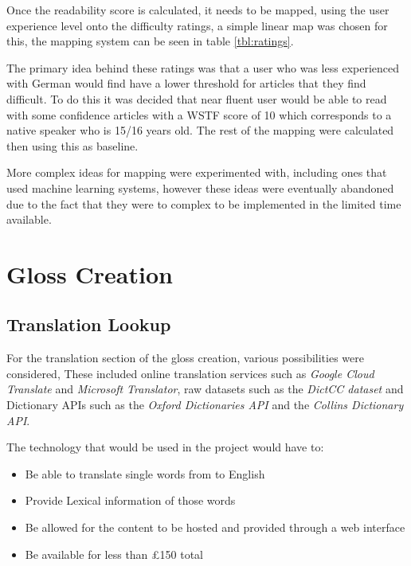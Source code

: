 Once the readability score is calculated, it needs to be mapped, using the user experience level onto the difficulty ratings, a simple linear map was chosen for this, the mapping system can be seen in table \ref{tbl:ratings}.



The primary idea behind these ratings was that a user who was less experienced with German would find have a lower threshold for articles that they find difficult. To do this it was decided that near fluent user would be able to read with some confidence articles with a WSTF score of 10 which corresponds to a native speaker who is 15/16 years old. The rest of the mapping were calculated then using this as baseline. 

More complex ideas for mapping were experimented with, including ones that used machine learning systems, however these ideas were eventually abandoned due to the fact that they were to complex to be implemented in the limited time available. 


\section{Gloss Creation}



\subsection{Translation Lookup}

For the translation section of the gloss creation, various possibilities were considered, These included online translation services such as \textit{Google Cloud Translate} and \textit{Microsoft Translator}, raw datasets such as the \textit{DictCC dataset} and Dictionary APIs such as the \textit{Oxford Dictionaries API} and the \textit{Collins Dictionary API}. 

The technology that would be used in the project would have to:
\begin{itemize}
\item Be able to translate single words from to English
\item Provide Lexical information of those words
\item Be allowed for the content to be hosted and provided through a web interface
\item Be available for less than \pounds150 total
\end{itemize}

